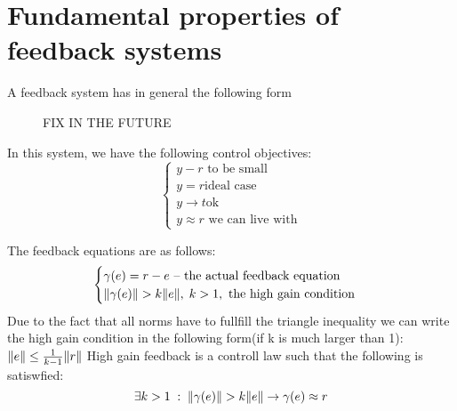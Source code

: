 
\chapter{Fundamental properties of feedback systems}

A feedback system has in general the following form
\begin{figure}[h!]
\centering
{}
\caption{FIX IN THE FUTURE}
\label{csys}
\end{figure}


In this system, we have the following control objectives:
\begin{equation}
    \begin{cases}
        y - r \text{ to be small}\\
        y = r \text{ideal case}\\
        y \rightarrow t \text{ok}\\
        y \approx r \text{ we can live with}
    \end{cases}
\end{equation}

The feedback equations are as follows:
\begin{equation}
    \begin{cases}
        \gamma(e) = r - e \text{ -- the actual feedback equation}\\
        \lVert\gamma(e)\rVert > k \lVert e\rVert,\; k > 1, \text{ the high gain condition}
    \end{cases}
\end{equation}
Due to the fact that all norms have to fullfill the triangle inequality we can write the high gain condition in the following form(if k is much larger than 1): $ \lVert e\rVert \le \frac{1}{k-1}\lVert r\rVert$
{
    High gain feedback is a controll law such that the following is satiswfied:
    \begin{equation}
        \exists k > 1 \; : \; \lVert\gamma(e)\rVert > k \lVert e\rVert \rightarrow  \gamma(e) \approx r  
    \end{equation}
}
